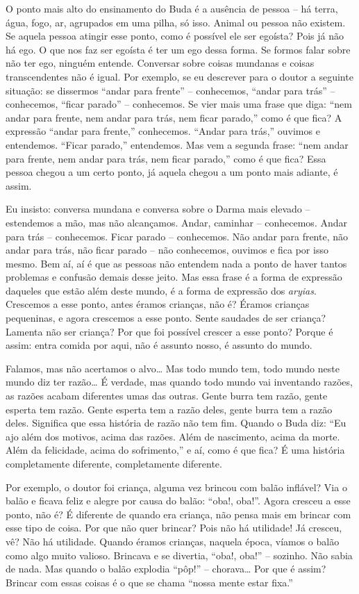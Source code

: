 O ponto mais alto do ensinamento do Buda é a ausência de pessoa – há
terra, água, fogo, ar, agrupados em uma pilha, só isso. Animal ou
pessoa não existem. Se aquela pessoa atingir esse ponto, como é
possível ele ser egoísta? Pois já não há ego. O que nos faz ser egoísta
é ter um ego dessa forma. Se formos falar sobre não ter ego, ninguém
entende. Conversar sobre coisas mundanas e coisas transcendentes não é
igual. Por exemplo, se eu descrever para o doutor a seguinte situação:
se dissermos “andar para frente” – conhecemos, “andar para trás” –
conhecemos, “ficar parado” – conhecemos. Se vier mais uma frase que
diga: “nem andar para frente, nem andar para trás, nem ficar parado,”
como é que fica? A expressão “andar para frente,” conhecemos. “Andar
para trás,” ouvimos e entendemos. “Ficar parado,” entendemos. Mas vem a
segunda frase: “nem andar para frente, nem andar para trás, nem ficar
parado,” como é que fica? Essa pessoa chegou a um certo ponto, já
aquela chegou a um ponto mais adiante, é assim.

Eu insisto: conversa mundana e conversa sobre o Darma mais elevado –
estendemos a mão, mas não alcançamos. Andar, caminhar – conhecemos.
Andar para trás – conhecemos. Ficar parado – conhecemos. Não andar para
frente, não andar para trás, não ficar parado – não conhecemos, ouvimos
e fica por isso mesmo. Bem aí, aí é que as pessoas não entendem nada a
ponto de haver tantos problemas e confusão demais desse jeito. Mas essa
frase é a forma de expressão daqueles que estão além deste mundo, é a
forma de expressão dos \emph{aryias}.
Crescemos a esse ponto, antes éramos crianças, não
é? Éramos crianças pequeninas, e agora crescemos a esse ponto. Sente
saudades de ser criança? Lamenta não ser criança? Por que foi possível
crescer a esse ponto? Porque é assim: entra comida por aqui, não é
assunto nosso, é assunto do mundo. 

Falamos, mas não acertamos o alvo\ldots{} Mas todo mundo tem, todo mundo
neste mundo diz ter razão\ldots{} É verdade, mas quando todo mundo vai
inventando razões, as razões acabam diferentes umas das outras. Gente
burra tem razão, gente esperta tem razão. Gente esperta tem a razão
deles, gente burra tem a razão deles. Significa que essa história de
razão não tem fim. Quando o Buda diz: “Eu ajo além dos motivos, acima
das razões. Além de nascimento, acima da morte. Além da felicidade,
acima do sofrimento,” e aí, como é que fica? É uma história
completamente diferente, completamente diferente. 

Por exemplo, o doutor foi criança, alguma vez brincou com balão
inflável? Via o balão e ficava feliz e alegre por causa do balão:
“oba!, oba!”. Agora cresceu a esse ponto, não é? É diferente de quando
era criança, não pensa mais em brincar com esse tipo de coisa. Por que
não quer brincar? Pois não há utilidade! Já cresceu, vê? Não há
utilidade. Quando éramos crianças, naquela época, víamos o balão como
algo muito valioso. Brincava e se divertia, “oba!, oba!” – sozinho. Não
sabia de nada. Mas quando o balão explodia “pôp!” – chorava\ldots{} Por que é
assim? Brincar com essas coisas é o que se chama “nossa mente estar
fixa.” 


